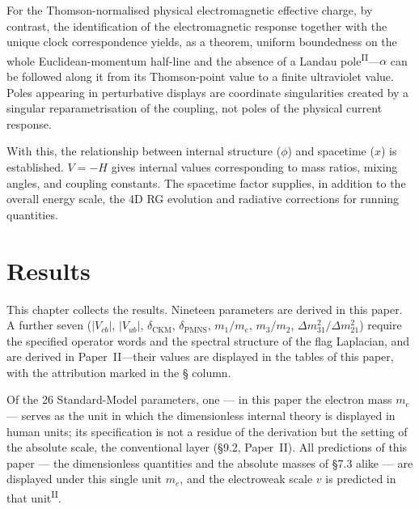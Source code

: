 \documentclass[12pt,a4paper]{article}
\newcommand{\PII}{\textsuperscript{\textup{II}}}
\begin{document}
For the Thomson-normalised
physical electromagnetic effective charge, by contrast, the
identification of the electromagnetic response together with the unique clock correspondence yields, as a theorem, uniform boundedness
on the whole Euclidean-momentum half-line and the absence of a Landau
pole\PII{}---$\alpha$ can be followed along it from its Thomson-point
value to a finite ultraviolet value. Poles appearing in perturbative
displays are coordinate singularities created by a singular
reparametrisation of the coupling, not poles of the physical current
response.

With this, the relationship between internal structure ($\phi$) and spacetime ($x$) is established. $V = -H$ gives internal values corresponding to mass ratios, mixing angles, and coupling constants. The spacetime factor supplies, in addition to the overall energy scale, the 4D RG evolution and radiative corrections for running quantities.

\section{Results}\label{sec:results}

This chapter collects the results. Nineteen parameters are derived in
this paper. A further seven ($|V_{cb}|$, $|V_{ub}|$, $\delta_\mathrm{CKM}$,
$\delta_\mathrm{PMNS}$, $m_1/m_e$, $m_3/m_2$, $\Delta m^2_{31}/\Delta m^2_{21}$)
require the specified operator words and the spectral structure of the flag Laplacian, and are derived in Paper~II---their values are displayed in the tables of this paper, with the attribution marked in the \S{} column.

Of the 26 Standard-Model parameters, one — in this paper the electron mass $m_e$ — serves as the unit in which the dimensionless internal theory is displayed in human units; its specification is not a residue of the derivation but the setting of the absolute scale, the conventional layer (\S9.2, Paper~II). All predictions of this paper --- the dimensionless quantities and the absolute masses of \S7.3 alike --- are displayed under this single unit $m_e$, and the electroweak scale $v$ is predicted in that unit\PII{}.
\end{document}
